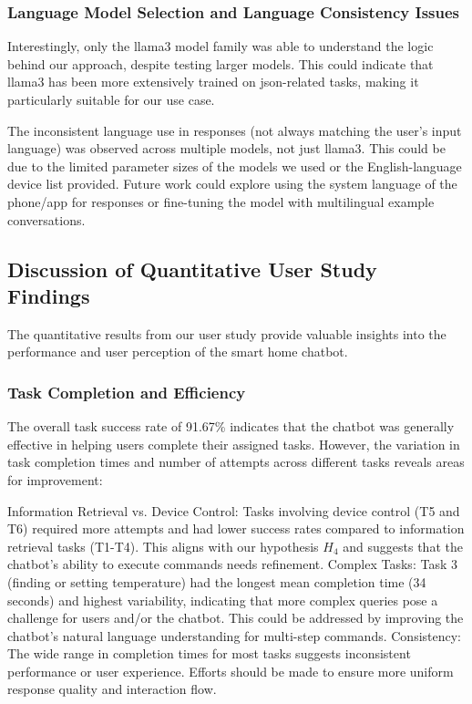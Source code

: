 \subsubsection{Language Model Selection and Language Consistency Issues}
Interestingly, only the llama3 model family was able to understand the logic behind our approach, despite testing larger models. This could indicate that llama3 has been more extensively trained on \gls{json}-related tasks, making it particularly suitable for our use case.

The inconsistent language use in responses (not always matching the user's input language) was observed across multiple models, not just llama3. This could be due to the limited parameter sizes of the models we used or the English-language device list provided. Future work could explore using the system language of the phone/app for responses or fine-tuning the model with multilingual example conversations.

\subsection{Discussion of Quantitative User Study Findings}
The quantitative results from our user study provide valuable insights into the performance and user perception of the smart home chatbot.
\subsubsection{Task Completion and Efficiency}
The overall task success rate of 91.67\% indicates that the chatbot was generally effective in helping users complete their assigned tasks. However, the variation in task completion times and number of attempts across different tasks reveals areas for improvement:

Information Retrieval vs. Device Control: Tasks involving device control (T5 and T6) required more attempts and had lower success rates compared to information retrieval tasks (T1-T4). This aligns with our hypothesis \(H_4\) and suggests that the chatbot's ability to execute commands needs refinement.
Complex Tasks: Task 3 (finding or setting temperature) had the longest mean completion time (34 seconds) and highest variability, indicating that more complex queries pose a challenge for users and/or the chatbot. This could be addressed by improving the chatbot's natural language understanding for multi-step commands.
Consistency: The wide range in completion times for most tasks suggests inconsistent performance or user experience. Efforts should be made to ensure more uniform response quality and interaction flow.

